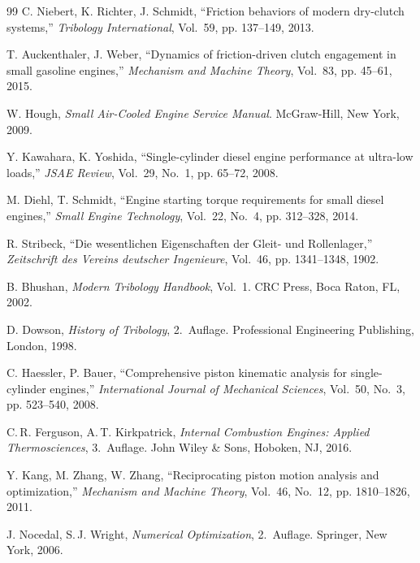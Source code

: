 ﻿\documentclass[a4paper,12pt]{article}
\begin{document}
\begin{thebibliography}{99}
	C. Niebert, K. Richter, J. Schmidt,
	``Friction behaviors of modern dry-clutch systems,''
	\textit{Tribology International}, Vol.~59, pp. 137--149, 2013.
	
	T. Auckenthaler, J. Weber,
	``Dynamics of friction-driven clutch engagement in small gasoline engines,''
	\textit{Mechanism and Machine Theory}, Vol.~83, pp. 45--61, 2015.
	
	W. Hough,
	\textit{Small Air-Cooled Engine Service Manual}.
	McGraw-Hill, New York, 2009.
	
	Y. Kawahara, K. Yoshida,
	``Single-cylinder diesel engine performance at ultra-low loads,''
	\textit{JSAE Review}, Vol.~29, No.~1, pp. 65--72, 2008.
	
	M. Diehl, T. Schmidt,
	``Engine starting torque requirements for small diesel engines,''
	\textit{Small Engine Technology}, Vol.~22, No.~4, pp. 312--328, 2014.
	
	R. Stribeck,
	``Die wesentlichen Eigenschaften der Gleit- und Rollenlager,''
	\textit{Zeitschrift des Vereins deutscher Ingenieure}, Vol.~46, pp. 1341--1348, 1902.
	
	B. Bhushan,
	\textit{Modern Tribology Handbook}, Vol.~1.
	CRC Press, Boca Raton, FL, 2002.
	
	D. Dowson,
	\textit{History of Tribology}, 2.~Auflage.
	Professional Engineering Publishing, London, 1998.
	
	C. Haessler, P. Bauer,
	``Comprehensive piston kinematic analysis for single-cylinder engines,''
	\textit{International Journal of Mechanical Sciences}, Vol.~50, No.~3, pp. 523--540, 2008.
	
	C.\,R. Ferguson, A.\,T. Kirkpatrick,
	\textit{Internal Combustion Engines: Applied Thermosciences}, 3.~Auflage.
	John Wiley \& Sons, Hoboken, NJ, 2016.
	
	Y. Kang, M. Zhang, W. Zhang,
	``Reciprocating piston motion analysis and optimization,''
	\textit{Mechanism and Machine Theory}, Vol.~46, No.~12, pp. 1810--1826, 2011.
	
	J. Nocedal, S.\,J. Wright,
	\textit{Numerical Optimization}, 2.~Auflage.
	Springer, New York, 2006.
	

\end{thebibliography}
\end{document}
